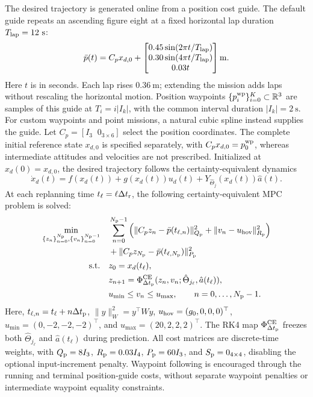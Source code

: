 \documentclass[11pt]{article}
\begin{document}
The desired trajectory is generated online from a position cost guide.
The default guide repeats an ascending figure eight at a fixed horizontal
lap duration $T_{\rm lap}=12~\mathrm s$:
\begin{equation}
    \bar p(t)=C_px_{d,0}+
       \begin{bmatrix}
          0.45\sin(2\pi t/T_{\rm lap})\\
          0.30\sin(4\pi t/T_{\rm lap})\\
          0.03t
       \end{bmatrix}\mathrm m.
\end{equation}
Here $t$ is in seconds. Each lap rises $0.36~\mathrm m$; extending
the mission adds laps without rescaling the horizontal motion.
Position waypoints $\{p_i^{\rm wp}\}_{i=0}^{K}\subset\mathbb R^3$
are samples of this guide at $T_i=i|I_k|$, with the common interval
duration $|I_k|=2~\mathrm s$. For custom waypoints and point missions,
a natural cubic spline instead supplies the guide. Let
$C_p=[I_3\;\;0_{3\times6}]$ select the position coordinates.
The complete initial reference state $x_{d,0}$ is specified separately,
with $C_px_{d,0}=p_0^{\rm wp}$, whereas intermediate attitudes and
velocities are not prescribed. Initialized at $x_d(0)=x_{d,0}$, the
desired trajectory follows the certainty-equivalent dynamics
\begin{equation}\label{eq:quad-reference}
    \dot x_d(t)=f(x_d(t))+g(x_d(t))u_d(t)
        +Y_{\hat\Theta_j}(x_d(t))\hat a(t).
\end{equation}
At each replanning time $t_\ell=\ell\Delta t_{\rm r}$, the following
certainty-equivalent MPC problem is solved:
\begin{equation}\label{eq:quad-mpc}
\begin{aligned}
    \min_{\{z_n\}_{n=0}^{N_{\rm p}},\{v_n\}_{n=0}^{N_{\rm p}-1}}\quad&
    \sum_{n=0}^{N_{\rm p}-1}\left(
        \|C_pz_n-\bar p(t_{\ell,n})\|_{Q_{\rm p}}^2
        +\|v_n-u_{\rm hov}\|_{R_{\rm p}}^2\right)\\
    &+\|C_pz_{N_{\rm p}}-\bar p(t_{\ell,N_{\rm p}})\|_{P_{\rm p}}^2\\
    \text{s.t.}\quad&z_0=x_d(t_\ell),\\
    &z_{n+1}=\Phi_{\Delta t_{\rm p}}^{\rm CE}
      (z_n,v_n;\hat\Theta_{j_\ell},\hat a(t_\ell)),\\
    &u_{\min}\le v_n\le u_{\max},\qquad n=0,\ldots,N_{\rm p}-1.
\end{aligned}
\end{equation}
Here, $t_{\ell,n}=t_\ell+n\Delta t_{\rm p}$,
$\|y\|_W^2=y^\top Wy$, $u_{\rm hov}=(g_0,0,0,0)^\top$,
$u_{\min}=(0,-2,-2,-2)^\top$, and
$u_{\max}=(20,2,2,2)^\top$. The RK4 map
$\Phi_{\Delta t_{\rm p}}^{\rm CE}$ freezes both
$\hat\Theta_{j_\ell}$ and $\hat a(t_\ell)$ during prediction.
All cost matrices are discrete-time weights, with
$Q_{\rm p}=8I_3$, $R_{\rm p}=0.03I_4$, $P_{\rm p}=60I_3$, and
$S_{\rm p}=0_{4\times4}$, disabling the optional input-increment penalty.
Waypoint following is encouraged through the running and terminal
position-guide costs, without separate waypoint penalties or intermediate
waypoint equality constraints.
\end{document}
